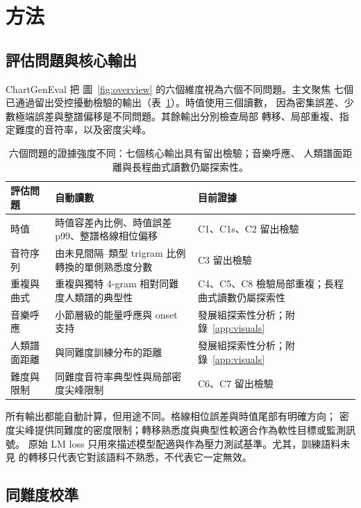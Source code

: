 \documentclass[10pt,twocolumn]{article}
\newcommand{\figref}[1]{圖~\ref{#1}}
\newcommand{\tabref}[1]{表~\ref{#1}}
\begin{document}
\section{方法}\label{sec:methods}

\subsection{評估問題與核心輸出}\label{sec:suite}

ChartGenEval 把 \figref{fig:overview} 的六個維度視為六個不同問題。主文聚焦
七個已通過留出受控擾動檢驗的輸出（\tabref{tab:suite}）。時值使用三個讀數，
因為密集誤差、少數極端誤差與整譜偏移是不同問題。其餘輸出分別檢查局部
轉移、局部重複、指定難度的音符率，以及密度尖峰。

\begin{table}[t]
\centering
\footnotesize
\setlength{\tabcolsep}{6pt}
\renewcommand{\arraystretch}{1.15}
\begin{tabular}{@{}p{}p{}p{}@{}}
\toprule
評估問題 & 自動讀數 & 目前證據 \\
\midrule
時值 & 時值容差內比例、時值誤差 p99、整譜格線相位偏移 &
C1、C1s、C2 留出檢驗 \\
音符序列 & 由未見間隔--類型 trigram 比例轉換的單側熟悉度分數 &
C3 留出檢驗 \\
重複與曲式 & 重複與獨特 4-gram 相對同難度人類譜的典型性 &
C4、C5、C8 檢驗局部重複；長程曲式讀數仍屬探索性 \\
音樂呼應 & 小節層級的能量呼應與 onset 支持 &
發展組探索性分析；附錄~\ref{app:visuals} \\
人類譜面距離 & 與同難度訓練分布的距離 &
發展組探索性分析；附錄~\ref{app:visuals} \\
難度與限制 & 同難度音符率典型性與局部密度尖峰限制 &
C6、C7 留出檢驗 \\
\bottomrule
\end{tabular}
\caption{六個問題的證據強度不同：七個核心輸出具有留出檢驗；音樂呼應、
人類譜面距離與長程曲式讀數仍屬探索性。}
\label{tab:suite}
\end{table}

所有輸出都能自動計算，但用途不同。格線相位誤差與時值尾部有明確方向；
密度尖峰提供同難度的密度限制；轉移熟悉度與典型性較適合作為軟性目標或監測訊號。
原始 LM loss 只用來描述模型配適與作為壓力測試基準。尤其，訓練語料未見
的轉移只代表它對該語料不熟悉，不代表它一定無效。

\subsection{同難度校準}\label{sec:layers}
\end{document}
